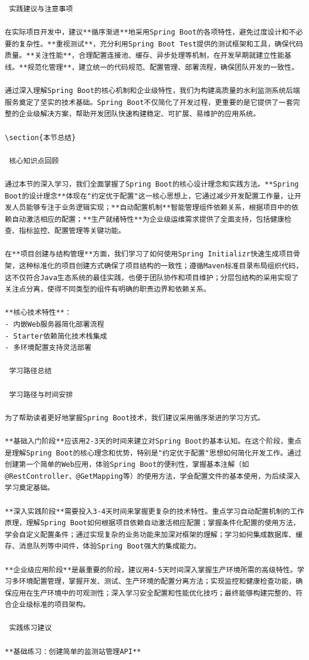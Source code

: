 \begin{lstlisting}
 实践建议与注意事项

在实际项目开发中，建议**循序渐进**地采用Spring Boot的各项特性，避免过度设计和不必要的复杂性。**重视测试**，充分利用Spring Boot Test提供的测试框架和工具，确保代码质量。**关注性能**，合理配置连接池、缓存、异步处理等机制，在开发早期就建立性能基线。**规范化管理**，建立统一的代码规范、配置管理、部署流程，确保团队开发的一致性。

通过深入理解Spring Boot的核心机制和企业级特性，我们为构建高质量的水利监测系统后端服务奠定了坚实的技术基础。Spring Boot不仅简化了开发过程，更重要的是它提供了一套完整的企业级解决方案，帮助开发团队快速构建稳定、可扩展、易维护的应用系统。

\section{本节总结}

 核心知识点回顾

通过本节的深入学习，我们全面掌握了Spring Boot的核心设计理念和实践方法。**Spring Boot的设计理念**体现在"约定优于配置"这一核心思想上，它通过减少开发配置工作量，让开发人员能够专注于业务逻辑实现；**自动配置机制**智能管理组件依赖关系，根据项目中的依赖自动激活相应的配置；**生产就绪特性**为企业级运维需求提供了全面支持，包括健康检查、指标监控、配置管理等关键功能。

在**项目创建与结构管理**方面，我们学习了如何使用Spring Initializr快速生成项目骨架，这种标准化的项目创建方式确保了项目结构的一致性；遵循Maven标准目录布局组织代码，这不仅符合Java生态系统的最佳实践，也便于团队协作和项目维护；分层包结构的采用实现了关注点分离，使得不同类型的组件有明确的职责边界和依赖关系。

**核心技术特性**：
- 内嵌Web服务器简化部署流程
- Starter依赖简化技术栈集成
- 多环境配置支持灵活部署

 学习路径总结

 学习路径与时间安排

为了帮助读者更好地掌握Spring Boot技术，我们建议采用循序渐进的学习方式。

**基础入门阶段**应该用2-3天的时间来建立对Spring Boot的基本认知。在这个阶段，重点是理解Spring Boot的核心理念和优势，特别是"约定优于配置"思想如何简化开发工作。通过创建第一个简单的Web应用，体验Spring Boot的便利性，掌握基本注解（如@RestController、@GetMapping等）的使用方法，学会配置文件的基本使用，为后续深入学习奠定基础。

**深入实践阶段**需要投入3-4天时间来掌握更复杂的技术特性。重点学习自动配置机制的工作原理，理解Spring Boot如何根据项目依赖自动激活相应配置；掌握条件化配置的使用方法，学会自定义配置条件；通过实现复杂的业务功能来加深对框架的理解；学习如何集成数据库、缓存、消息队列等中间件，体验Spring Boot强大的集成能力。

**企业级应用阶段**是最重要的阶段，建议用4-5天时间深入掌握生产环境所需的高级特性。学习多环境配置管理，掌握开发、测试、生产环境的配置分离方法；实现监控和健康检查功能，确保应用在生产环境中的可观测性；深入学习安全配置和性能优化技巧；最终能够构建完整的、符合企业级标准的项目架构。

 实践练习建议

**基础练习：创建简单的监测站管理API**
\end{lstlisting}

